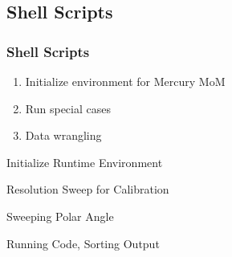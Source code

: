 % 

\subsection{Shell Scripts}
\renewcommand{\listingFontSize}{\tiny} 
\begin{frame}\frametitle{Shell Scripts}
\begin{enumerate}
	\item Initialize environment for Mercury MoM
	\item Run special cases
	\item Data wrangling
\end{enumerate}
\end{frame}

 \begin{frame}{Initialize Runtime Environment}
    \lstset{style=bash}
    
\end{frame}

 \begin{frame}{Resolution Sweep for Calibration}
    \lstset{style=bash}
   
\end{frame}

 \begin{frame}{Sweeping Polar Angle}
    \lstset{style=bash}
   
\end{frame}

 \begin{frame}{Running Code, Sorting Output}
    \lstset{style=bash}
   
\end{frame}

\endinput  %
